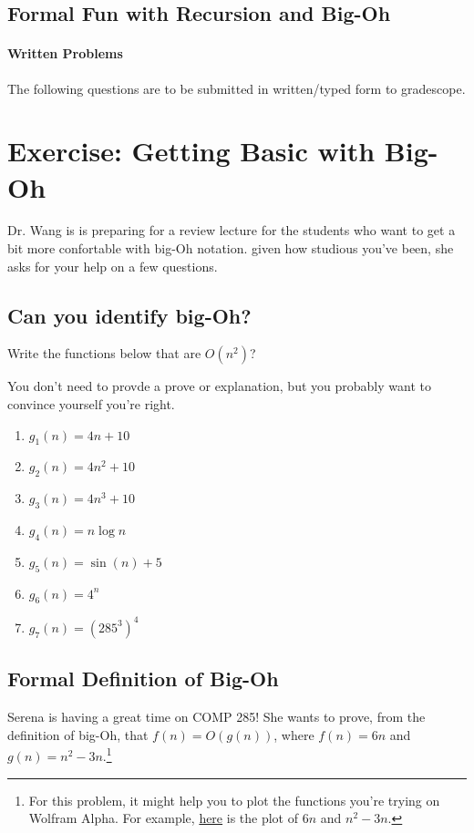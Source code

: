 \documentclass [12pt]{article}
\begin{document}
\begin{centering}
\section*{Formal Fun with Recursion and Big-Oh}
\end{centering}

\begin{Instruction}

\paragraph{Written Problems} The following questions are to be submitted in written/typed form to gradescope.

\end{Instruction}

\section{Exercise: Getting Basic with Big-Oh}
Dr. Wang is is preparing for a review lecture for the students who want to get a bit more confortable with big-Oh notation. given how studious you've been, she asks for your help on a few questions.

\subsection{Can you identify big-Oh?}
 Write the functions below that are $O(n^2)$?

You don't need to provde a prove or explanation, but you probably want to convince yourself you're right.

\begin{enumerate}
    \item $g_1(n) = 4n + 10$
    \item $g_2(n) = 4n^2 + 10$
    \item $g_3(n) = 4n^3 + 10$
    \item $g_4(n) = n \log n$
    \item $g_5(n) = \sin(n) + 5$
    \item $g_6(n) = 4^n$
    \item $g_7(n) = (285^3)^4$
\end{enumerate}


\subsection{Formal Definition of Big-Oh}
 Serena is having a great time on COMP 285! She wants to prove, from the definition of big-Oh, that $f(n) = O(g(n))$, where $f (n) = 6n$ and $g(n) = n^2 - 3n$.\footnote{For this problem, it might help you to plot the functions you're trying on Wolfram Alpha. For example, \href{https://www.wolframalpha.com/input/?i=plot+5n+and+n\%5E2-3n+from+0+to+10}{here} is the plot of $6n$ and $n^2 - 3n$.}
\end{document}
